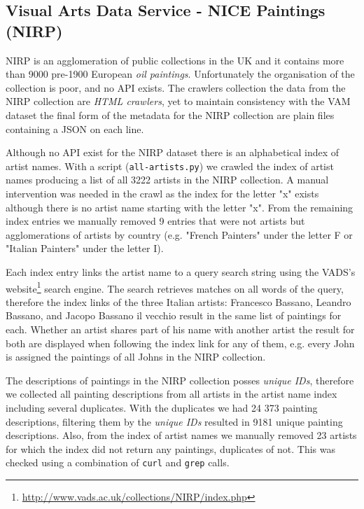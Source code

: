 \documentclass[11pt,a4paper,twoside,openright,draft]{report}
\begin{document}
\begin{multicols}{2}
\section{Visual Arts Data Service - NICE Paintings (NIRP)}

NIRP is an agglomeration of public collections in the UK and it contains more
than 9000 pre-1900 European \emph{oil paintings}.  Unfortunately the
organisation of the collection is poor, and no API exists.  The crawlers
collection the data from the NIRP collection are \emph{HTML crawlers}, yet to
maintain consistency with the VAM dataset the final form of the metadata for
the NIRP collection are plain files containing a JSON on each line.

Although no API exist for the NIRP dataset there is an alphabetical index of
artist names.  With a script (\texttt{all-artists.py}) we crawled the index of
artist names producing a list of all 3222 artists in the NIRP collection.
A manual intervention was needed in the crawl as the index for the letter "x"
exists although there is no artist name starting with the letter "x".  From the
remaining index entries we manually removed 9 entries that were not artists but
agglomerations of artists by country (e.g. "French Painters" under the letter F
or "Italian Painters" under the letter I).

Each index entry links the artist name to a query search string using the
VADS's website\footnote{\href{http://www.vads.ac.uk/collections/NIRP/index.php}
{http://www.vads.ac.uk/collections/NIRP/index.php}} search engine.  The search
retrieves matches on all words of the query, therefore the index links of the
three Italian artists: Francesco Bassano, Leandro Bassano, and Jacopo Bassano
il vecchio result in the same list of paintings for each.  Whether an artist
shares part of his name with another artist the result for both are displayed
when following the index link for any of them, e.g. every John is assigned the
paintings of all Johns in the NIRP collection.

The descriptions of paintings in the NIRP collection posses \emph{unique IDs},
therefore we collected all painting descriptions from all artists in the artist
name index including several duplicates.  With the duplicates we had 24 373
painting descriptions, filtering them by the \emph{unique IDs} resulted in 9181
unique painting descriptions.  Also, from the index of artist names we manually
removed 23 artists for which the index did not return any paintings, duplicates
of not.  This was checked using a combination of \texttt{curl} and
\texttt{grep} calls.


\end{multicols}
\end{document}
